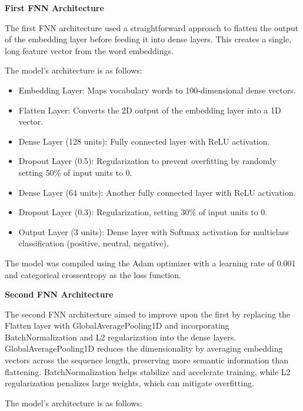 \textbf{First FNN Architecture
}

The first FNN architecture used a straightforward approach to flatten the output of the embedding layer before feeding it into dense layers. This creates a single, long feature vector from the word embeddings.

The model's architecture is as follows:

\begin{itemize}
    \item Embedding Layer: Maps vocabulary words to 100-dimensional dense vectors.
    \item Flatten Layer: Converts the 2D output of the embedding layer into a 1D vector.
    \item Dense Layer (128 units): Fully connected layer with ReLU activation.
    \item Dropout Layer (0.5): Regularization to prevent overfitting by randomly setting 50\% of input units to 0.
    \item Dense Layer (64 units): Another fully connected layer with ReLU activation.
    \item Dropout Layer (0.3): Regularization, setting 30\% of input units to 0.
    \item Output Layer (3 units): Dense layer with Softmax activation for multiclass classification (positive, neutral, negative).
\end{itemize}

The model was compiled using the Adam optimizer with a learning rate of 0.001 and categorical crossentropy as the loss function.

\textbf{Second FNN Architecture}

The second FNN architecture aimed to improve upon the first by replacing the Flatten layer with GlobalAveragePooling1D and incorporating BatchNormalization and L2 regularization into the dense layers. GlobalAveragePooling1D reduces the dimensionality by averaging embedding vectors across the sequence length, preserving more semantic information than flattening. BatchNormalization helps stabilize and accelerate training, while L2 regularization penalizes large weights, which can mitigate overfitting.

The model's architecture is as follows:

